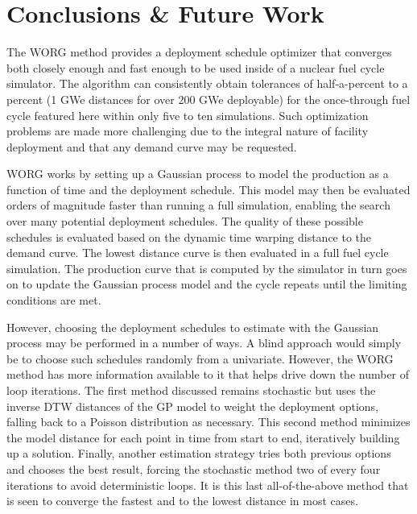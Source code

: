 \section{Conclusions \& Future Work}
\label{conclusion}

The WORG method provides a deployment schedule optimizer that converges
both closely enough and fast enough to be used inside
of a nuclear fuel cycle simulator. The algorithm can consistently obtain
tolerances of half-a-percent to a percent (1 GWe distances for over 200 GWe
deployable) for the once-through fuel cycle featured here within only five to
ten simulations. Such optimization problems are made
more challenging due to the integral nature of facility deployment and
that any demand curve may be requested.

WORG works by setting up a Gaussian process to model the production
as a function of time and the deployment schedule. This model may then
be evaluated orders of magnitude faster than running a full simulation, enabling
the search over many potential deployment schedules. The quality of these
possible schedules is evaluated based on the dynamic time warping distance
to the demand curve. The lowest distance curve is then evaluated in a
full fuel cycle simulation. The production curve that is computed by the
simulator in turn goes on to update the Gaussian process model and the
cycle repeats until the limiting conditions are met.

However, choosing the deployment schedules to estimate with the Gaussian
process may be performed in a number of ways. A blind approach would
simply be to choose such schedules randomly from a univariate. However,
the WORG method has more information available to it that helps drive
down the number of loop iterations. The first method discussed remains
stochastic but uses the inverse DTW distances of the GP model to
weight the deployment options, falling back to a Poisson distribution as
necessary. This second method minimizes the model distance for each point
in time from start to end, iteratively building up a solution. Finally,
another estimation strategy tries both previous options and chooses the
best result, forcing the stochastic method two of every four iterations
to avoid deterministic loops.  It is this last all-of-the-above method
that is seen to converge the fastest and to the lowest distance in most
cases.

